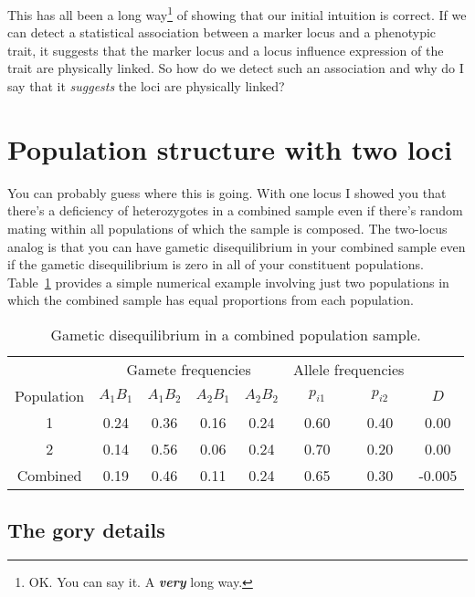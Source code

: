 This has all been a long way\footnote{OK. You can say it. A {\bf\it
    very\/} long way.} of showing that our initial intuition is
correct. If we can detect a statistical association between a marker
locus and a phenotypic trait, it suggests that the marker locus and a
locus influence expression of the trait are physically linked. So how
do we detect such an association and why do I say that it {\it
  suggests} the loci are physically linked?

\section*{Population structure with two loci}

You can probably guess where this is going. With one locus I showed
you that there's a deficiency of heterozygotes in a combined sample
even if there's random mating within all populations of which the
sample is composed. The two-locus analog is that you can have gametic
disequilibrium in your combined sample even if the gametic
disequilibrium is zero in all of your constituent
populations. Table~\ref{table:d-structure} provides a simple numerical
example involving just two populations in which the combined sample
has equal proportions from each population.

\begin{table}
\begin{center}
\begin{tabular}{c|cccc|cc|c}
\hline\hline
           & \multicolumn{4}{c|}{Gamete frequencies} 
           & \multicolumn{2}{c|}{Allele frequencies} \\
Population & $A_1B_1$ & $A_1B_2$ & $A_2B_1$ & $A_2B_2$ 
           & $p_{i1}$ & $p_{i2}$ & $D$ \\
\hline
1          & 0.24     & 0.36     & 0.16    & 0.24
           & 0.60     & 0.40     & 0.00 \\
2          & 0.14     & 0.56     & 0.06    & 0.24
           & 0.70     & 0.20     & 0.00 \\
Combined   & 0.19     & 0.46     & 0.11    & 0.24
           & 0.65     & 0.30     & -0.005 \\
\hline
\end{tabular}
\end{center}
\caption{Gametic disequilibrium in a combined population
  sample.}\label{table:d-structure}
\end{table}

\subsection*{The gory details}


